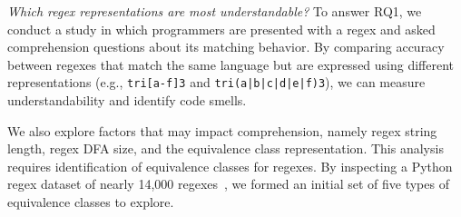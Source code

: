 
%
%

 {\em Which regex representations are most understandable?}
To answer RQ1, we conduct a study in which programmers are presented with a regex and asked comprehension questions about its matching behavior. By comparing accuracy between  regexes that match the same language but are expressed using different representations (e.g., \verb!tri[a-f]3! and \verb!tri(a|b|c|d|e|f)3!), we can measure understandability and identify code smells.

We also explore factors that may impact comprehension, namely regex string length, regex DFA size, and the equivalence class representation.
This analysis requires identification of equivalence classes for regexes. By inspecting a Python regex dataset of nearly 14,000 regexes~\cite{chapman2016}, we formed an initial set of five types of equivalence classes to explore. \\

